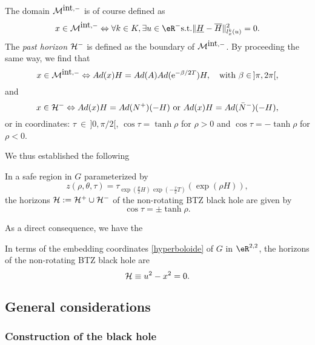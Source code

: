 			The domain ${\cal M}^{\mbox{int},-}$ is of course defined as
			\begin{equation}\label{interior}
				x \in {\cal M}^{\mbox{int},-} \Leftrightarrow \forall k \in K, \exists u \in
				\eR^-  \mbox{s.t.}  \|\underline{H} - \overline{H}\|^2_{l^k_x (u)}=0.
			\end{equation}
			The \emph{past horizon} ${\cal H^-}$ is defined as the boundary of ${\cal M}^{\mbox{int},-}$. By proceeding the same way, we find that
			\begin{equation}
				x \in {\cal M}^{\mbox{int},-} \Leftrightarrow Ad(x)H =
				Ad(A)Ad(\mbox{e}^{-\beta/2 T})H, \quad \mbox{with} \,\,
				\beta \in \, ]\pi,2 \pi[,
			\end{equation}
			and
			\begin{equation}
				x \in {\cal H^-} \Leftrightarrow Ad(x)H = Ad(N^+)(-H) \,\,
				\mbox{or} \,\, Ad(x)H = Ad(\bar{N}^-)(-H),
			\end{equation}
			or in coordinates: $\tau\ \in \, ]0,\pi/2[$, $\cos \tau = \tanh \rho$ for $\rho > 0$ and $\cos \tau =-\tanh \rho$ for $\rho < 0$.

We thus established the following
\begin{proposition}
	In a safe region in $G$ parameterized by
	\[
		z(\rho,\theta,\tau) =\tau_{\exp(\frac{\theta}{2}H) \, \exp(-\frac{\tau}{2} T)}(\exp(\rho H)),
	\]
	the horizons ${\cal H}:= {\cal H}^+ \cup {\cal H}^-$ of the non-rotating BTZ black hole are given by
	\begin{equation}
		\cos \tau = \pm \tanh \rho.
	\end{equation}
\end{proposition}
As a direct consequence, we have the
\begin{corollary}		\label{CorHorClassLat}
	In terms of the embedding coordinates \eqref{hyperboloide} of $G$ in
	$\eR^{2,2}$, the horizons of the non-rotating BTZ black hole are
	\begin{equation}
		{\cal H} \equiv u^2 - x^2 = 0.
	\end{equation}
\end{corollary}

\subsection{General considerations}

\subsubsection{Construction of the black hole}


